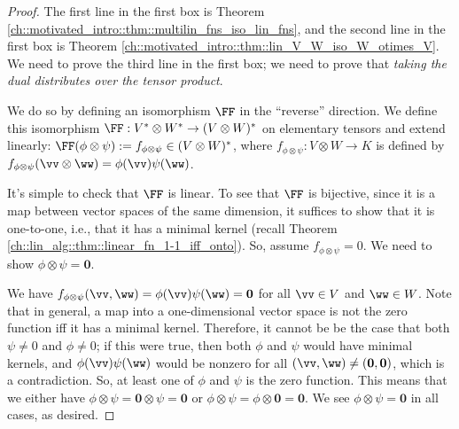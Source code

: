 \begin{proof}
    The first line in the first box is Theorem \ref{ch::motivated_intro::thm::multilin_fns_iso_lin_fns}, and the second line in the first box is Theorem \ref{ch::motivated_intro::thm::lin_V_W_iso_W_otimes_V}. We need to prove the third line in the first box; we need to prove that \textit{taking the dual distributes over the tensor product}.
    
    We do so by defining an isomorphism $\FF$ in the ``reverse'' direction. We define this isomorphism ${\FF:V^* \otimes W^* \rightarrow (V \otimes W)^*}$ on elementary tensors and extend linearly: $\FF(\phi \otimes \psi) := f_{\phi \otimes \psi} \in (V \otimes W)^*$, where $f_{\phi \otimes \psi}:V \otimes W \rightarrow K$ is defined by $f_{\phi \otimes \psi}(\vv \otimes \ww) = \phi(\vv) \psi(\ww)$.

    It's simple to check that $\FF$ is linear. To see that $\FF$ is bijective, since it is a map between vector spaces of the same dimension, it suffices to show that it is one-to-one, i.e., that it has a minimal kernel (recall Theorem \ref{ch::lin_alg::thm::linear_fn_1-1_iff_onto}). So, assume $f_{\phi \otimes \psi} = 0$. We need to show $\phi \otimes \psi = \mathbf{0}$.
    
    We have $f_{\phi \otimes \psi}(\vv, \ww) = \phi(\vv) \psi(\ww) = \mathbf{0}$ for all $\vv \in V$ and $\ww \in W$. Note that in general, a map into a one-dimensional vector space is not the zero function iff it has a minimal kernel. Therefore, it cannot be be the case that both $\psi \neq 0$ and $\phi \neq 0$; if this were true, then both $\phi$ and $\psi$ would have minimal kernels, and $\phi(\vv) \psi(\ww)$ would be nonzero for all $(\vv, \ww) \neq (\mathbf{0}, \mathbf{0})$, which is a contradiction. So, at least one of $\phi$ and $\psi$ is the zero function. This means that we either have $\phi \otimes \psi = \mathbf{0} \otimes \psi = \mathbf{0}$ or $\phi \otimes \psi = \phi \otimes \mathbf{0} = \mathbf{0}$. We see $\phi \otimes \psi = \mathbf{0}$ in all cases, as desired.
\end{proof}

